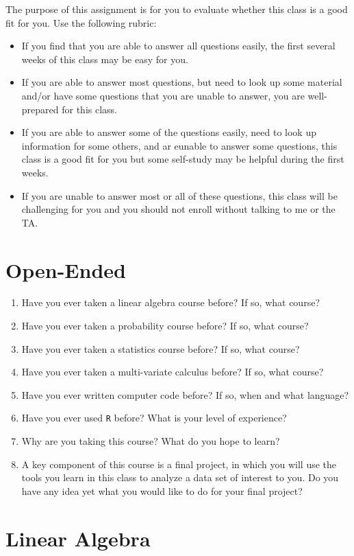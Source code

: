 \documentclass[paper=letter, fontsize=11pt]{scrartcl}
\numberwithin{equation}{section}
\numberwithin{figure}{section}
\numberwithin{table}{section}
\begin{document}
The purpose of this assignment is for you to evaluate whether this class is a good fit for you.
Use the following rubric:
\begin{itemize}
  \item If you find that you are able to answer all questions easily, the first several weeks of this class may be easy for you.
  \item If you are able to answer most questions, but need to look up some material and/or have some questions that you are unable to answer, you are well-prepared for this class.
  \item If you are able to answer some of the questions easily, need to look up information for some others, and ar eunable to answer some questions, this class is a good fit for you but some self-study may be helpful during the first weeks.
  \item If you are unable to answer most or all of these questions, this class will be challenging for you and you should not enroll without talking to me or the TA.
\end{itemize}

\section{Open-Ended}
\begin{enumerate}
  \item Have you ever taken a linear algebra course before? If so, what course?
  \item Have you ever taken a probability course before? If so, what course?
  \item Have you ever taken a statistics course before? If so, what course?
  \item Have you ever taken a multi-variate calculus before? If so, what course?
  \item Have you ever written computer code before? If so, when and what language?
  \item Have you ever used \texttt{R} before? What is your level of experience?
  \item Why are you taking this course? What do you hope to learn?
  \item A key component of this course is a final project, in which you will use the tools you learn in this class to analyze a data set of interest to you. Do you have any idea yet what you would like to do for your final project?
\end{enumerate}

\section{Linear Algebra}
\end{document}
